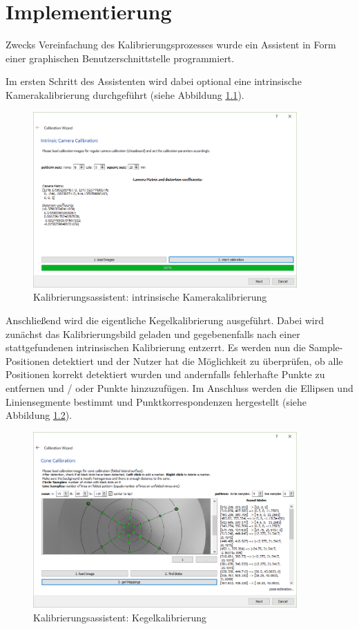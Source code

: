 \chapter{Implementierung}

Zwecks Vereinfachung des Kalibrierungsprozesses wurde ein Assistent in Form einer graphischen Benutzerschnittstelle programmiert. 

Im ersten Schritt des Assistenten wird dabei optional eine intrinsische Kamerakalibrierung durchgeführt (siehe Abbildung \ref{fig:wizard1}). 
\begin{figure}[!htb]
	\centering
	\includegraphics[width=0.9\textwidth]{images/GUI/calibWizard1_1.PNG}
	\caption{Kalibrierungsassistent: intrinsische Kamerakalibrierung}
	\label{fig:wizard1}
\end{figure}

Anschließend wird die eigentliche Kegelkalibrierung ausgeführt. Dabei wird zunächst das Kalibrierungsbild geladen und gegebenenfalls nach einer stattgefundenen intrinsischen Kalibrierung entzerrt. Es werden nun die Sample-Positionen detektiert und der Nutzer hat die Möglichkeit zu überprüfen, ob alle Positionen korrekt detektiert wurden und andernfalls fehlerhafte Punkte zu entfernen und / oder Punkte hinzuzufügen. Im Anschluss werden die Ellipsen und Liniensegmente bestimmt und Punktkorrespondenzen hergestellt (siehe Abbildung \ref{fig:wizard2}).

\begin{figure}[!htb]
	\centering
	\includegraphics[width=0.9\textwidth]{images/GUI/calibWizard2_1.PNG}
	\caption{Kalibrierungsassistent: Kegelkalibrierung}
	\label{fig:wizard2}
\end{figure}

